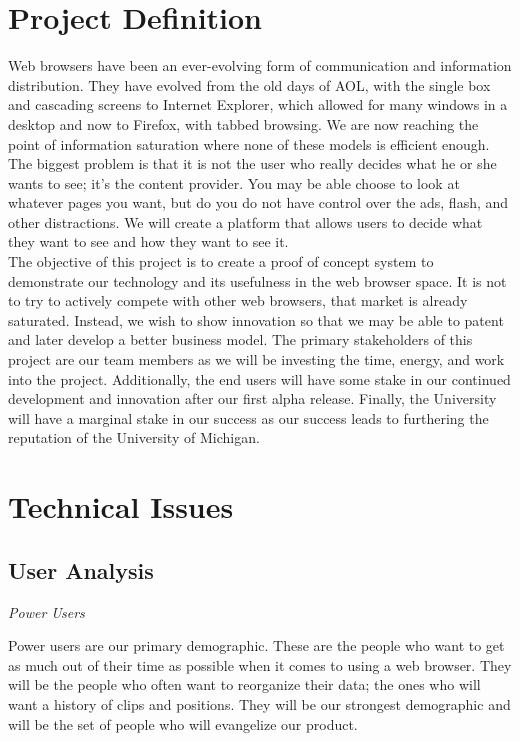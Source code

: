 \documentclass[12pt]{article}
\begin{document}
\section{Project Definition} %
\label{sec:project_definition}
Web browsers have been an ever-evolving form of communication and information distribution. They have evolved from the old days of AOL, with the single box and cascading screens to Internet Explorer, which allowed for many windows in a desktop and now to Firefox, with tabbed browsing. We are now reaching the point of information saturation where none of these models is efficient enough. The biggest problem is that it is not the user who really decides what he or she wants to see; it's the content provider. You may be able choose to look at whatever pages you want, but do you do not have control over the ads, flash, and other distractions. We will create a platform that allows users to decide what they want to see and how they want to see it. \\

The objective of this project is to create a proof of concept system to demonstrate our technology and its usefulness in the web browser space. It is not to try to actively compete with other web browsers, that market is already saturated. Instead, we wish to show innovation so that we may be able to patent and later develop a better business model. The primary stakeholders of this project are our team members as we will be investing the time, energy, and work into the project. Additionally, the end users will have some stake in our continued development and innovation after our first alpha release. Finally, the University will have a marginal stake in our success as our success leads to furthering the reputation of the University of Michigan.
\section{Technical Issues} %
\label{sec:technical_issues}
\subsection{User Analysis} %
\label{sub:user_analysis}
\emph{Power Users}

Power users are our primary demographic. These are the people who want to get as much out of their time as possible when it comes to using a web browser. They will be the people who often want to reorganize their data; the ones who will want a history of clips and positions. They will be our strongest demographic and will be the set of people who will evangelize our product. \\
\end{document}
